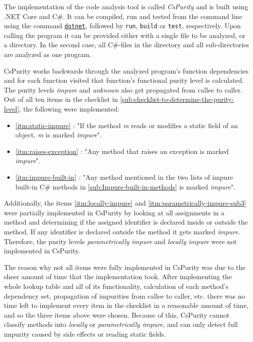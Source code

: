 \documentclass[a4paper,12pt]{article}
\newcommand{\Autoref}[1]{%
  \begingroup%
  \def\chapterautorefname{Chapter}%
  \def\sectionautorefname{Section}%
  \def\subsectionautorefname{Subsection}%
  \def\itemautorefname{Item}%
  \autoref{#1}%
  \endgroup%
}
\begin{document}

The implementation of the code analysis tool is called \textit{CsPurity} and is built using .NET Core and C\#. It can be compiled, run and tested from the command line using the command \href{https://docs.microsoft.com/en-us/dotnet/core/tools/}{\texttt{dotnet}}, followed by \texttt{run}, \texttt{build} or \texttt{test}, respectively. Upon calling the program it can be provided either with a single file to be analyzed, or a directory. In the second case, all C\#-files in the directory and all sub-directories are analyzed as one program.

CsPurity works backwards through the analyzed program's function dependencies and for each function visited that function's functional purity level is calculated. The purity levels \textit{impure} and \textit{unknown} also get propagated from callee to caller. Out of all ten items in the checklist in \autoref{sub:checklist-to-determine-the-purity-level}, the following were implemented:

\begin{itemize}
  \item \Autoref{itm:static-impure}: "If the method \textit{m} reads or modifies a static field of an object, \textit{m} is marked \textit{impure}".
  \item \Autoref{itm:raises-exception}: "Any method that raises an exception is marked \textit{impure}".
  \item \Autoref{itm:impure-built-in}: "Any method mentioned in the two lists of impure built-in C\# methods in \autoref{sub:Impure-built-in-methods} is marked \textit{impure}".
\end{itemize}


Additionally, the items \ref{itm:locally-impure} and \ref{itm:parametrically-impure-sub3} were partially implemented in CsPurity by looking at all assignments in a method and determining if the assigned identifier is declared inside or outside the method. If any identifier is declared outside the method it gets marked \textit{impure}. Therefore, the purity levels \textit{parametrically impure} and \textit{locally impure} were not implemented in CsPurity.

The reason why not all items were fully implemented in CsPurity was due to the sheer amount of time that the implementation took. After implementing the whole lookup table and all of its functionality, calculation of each method's dependency set, propagation of impurities from callee to caller, etc. there was no time left to implement every item in the checklist in a reasonable amount of time, and so the three items above were chosen. Because of this, CsPurity cannot classify methods into \textit{locally} or \textit{parametrically impure}, and can only detect full impurity caused by side effects or reading static fields.
\end{document}
